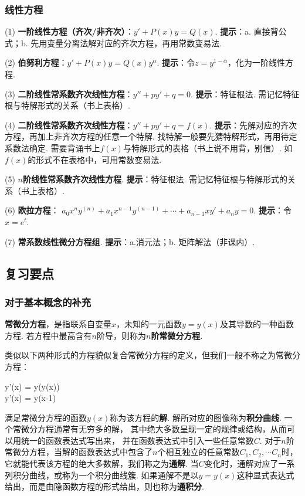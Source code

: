\subsubsection{线性方程}

(1) \textbf{一阶线性方程（齐次/非齐次）}：$y' + P(x)y = Q(x)$.
\textbf{提示}：a. 直接背公式；b. 先用变量分离法解对应的齐次方程，再用常数变易法.

(2) \textbf{伯努利方程}：$y' + P(x)y = Q(x)y^{\alpha}$.
\textbf{提示}：令$z = y^{1-\alpha}$，化为一阶线性方程.

(3) \textbf{二阶线性常系数齐次线性方程}：$y'' + py' + q =0$.
\textbf{提示}：特征根法. 需记忆特征根与特解形式的关系（书上表格）.

(4) \textbf{二阶线性常系数齐次线性方程}：$y'' + py' + q = f(x)$.
\textbf{提示}：先解对应的齐次方程，再加上非齐次方程的任意一个特解.
找特解一般要先猜特解形式，再用待定系数法确定.
需要背诵书上$f(x)$与特解形式的表格（书上说不用背，别信）.
如$f(x)$的形式不在表格中，可用常数变易法.

(5) \textbf{$n$阶线性常系数齐次线性方程}.
\textbf{提示}：特征根法. 需记忆特征根与特解形式的关系（书上表格）.

(6) \textbf{欧拉方程}：
$a_0 x^{n} y^{(n)} + a_1 x^{n-1} y^{(n-1)}+ \cdots + a_{n-1} xy' + a_n y = 0$.
\textbf{提示}：令$x = e^t$.

(7) \textbf{常系数线性微分方程组}.
\textbf{提示}：a.消元法；b. 矩阵解法（非课内）.

\subsection{复习要点} \par

\subsubsection{对于基本概念的补充}\par

\textbf{常微分方程}，是指联系自变量$x$，未知的一元函数$y = y(x)$及其导数的一种函数方程.
若方程中最高含有$n$阶导，则称为\textbf{$n$阶常微分方程}.

类似以下两种形式的方程貌似复合常微分方程的定义，但我们一般不称之为常微分方程：
\begin{eq1}
    y'(x) = y(y(x)) \\
    y'(x) = y(x-1)
\end{eq1}

满足常微分方程的函数$y(x)$称为该方程的\textbf{解}.
解所对应的图像称为\textbf{积分曲线}.
一个常微分方程通常有无穷多的解，
其中绝大多数呈现一定的规律或结构，从而可以用统一的函数表达式写出来，
并在函数表达式中引入一些任意常数$C$.
对于$n$阶常微分方程，当解的函数表达式中包含了$n$个相互独立的任意常数$C_1,C_2,\cdots C_n$时，
它就能代表该方程的绝大多数解，我们称之为\textbf{通解}.
当$C$变化时，通解对应了一系列积分曲线，或称为一个积分曲线簇.
如果通解不是以$y = y(x)$这种显式表达式给出，而是由隐函数方程的形式给出，则也称为\textbf{通积分}.

